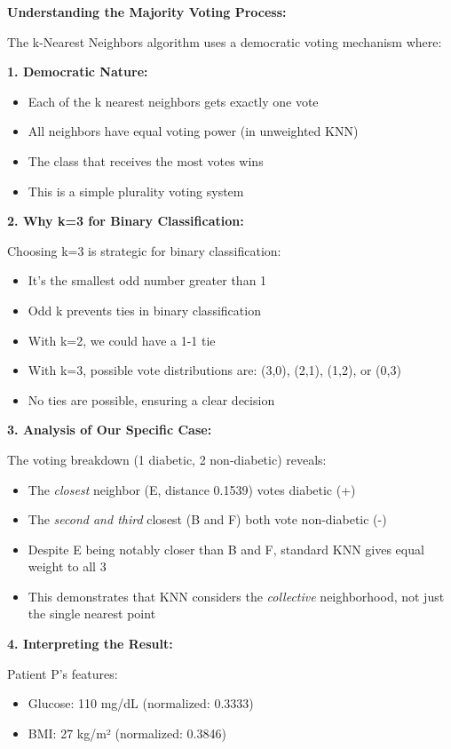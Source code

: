 \documentclass[12pt]{article}
\begin{document}
\begin{explanation}
\textbf{Understanding the Majority Voting Process:}

The k-Nearest Neighbors algorithm uses a democratic voting mechanism where:

\textbf{1. Democratic Nature:}
\begin{itemize}
    \item Each of the k nearest neighbors gets exactly one vote
    \item All neighbors have equal voting power (in unweighted KNN)
    \item The class that receives the most votes wins
    \item This is a simple plurality voting system
\end{itemize}

\textbf{2. Why k=3 for Binary Classification:}

Choosing k=3 is strategic for binary classification:
\begin{itemize}
    \item It's the smallest odd number greater than 1
    \item Odd k prevents ties in binary classification
    \item With k=2, we could have a 1-1 tie
    \item With k=3, possible vote distributions are: (3,0), (2,1), (1,2), or (0,3)
    \item No ties are possible, ensuring a clear decision
\end{itemize}

\textbf{3. Analysis of Our Specific Case:}

The voting breakdown (1 diabetic, 2 non-diabetic) reveals:
\begin{itemize}
    \item The \textit{closest} neighbor (E, distance 0.1539) votes diabetic (+)
    \item The \textit{second and third} closest (B and F) both vote non-diabetic (-)
    \item Despite E being notably closer than B and F, standard KNN gives equal weight to all 3
    \item This demonstrates that KNN considers the \textit{collective} neighborhood, not just the single nearest point
\end{itemize}

\textbf{4. Interpreting the Result:}

Patient P's features:
\begin{itemize}
    \item Glucose: 110 mg/dL (normalized: 0.3333)
    \item BMI: 27 kg/m² (normalized: 0.3846)
\end{itemize}


\end{explanation}
\end{document}
